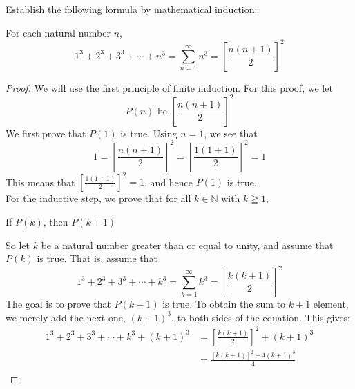 \newpage
\begin{example}
Establish the following formula by mathematical induction:
    
    \begin{tcolorbox}
        \begin{theorem}
            For each natural number $n$,
                \begin{equation*}
                    1^3 + 2^3 + 3^3  + \cdots + n^3 = \sum_{n=1}^{\infty}{n^3} = \left [\frac{n(n+1)}{2} \right ]^2
                \end{equation*}
        \end{theorem}
    \end{tcolorbox}

    \begin{proof}
        We will use the first principle of finite induction. For this proof, we let
            \begin{equation*}
                P(n) \text{ be } \left [\frac{n(n+1)}{2} \right ]^2
            \end{equation*}
        We first prove that $P(1)$ is true. Using $n=1$, we see that
            \begin{equation*}
                1 = \left [\frac{n(n+1)}{2} \right ]^2 = \left [\frac{1(1+1)}{2} \right ]^2 = 1
            \end{equation*}
        This means that $\left [\frac{1(1+1)}{2} \right ]^2 = 1$, and hence $P(1)$ is true. \\
        For the inductive step, we prove that for all $k \in \mathbb{N}$ with $k \geqq 1$, 
            \begin{center}
                If $P(k)$, then $P(k+1)$
            \end{center}
        So let $k$ be a natural number greater than or equal to unity, and assume that $P(k)$ is true. That is, assume that 
            \begin{equation*}
               1^3 + 2^3 + 3^3  + \cdots + k^3 = \sum_{k=1}^{\infty}{k^3} = \left [\frac{k(k+1)}{2} \right ]^2
            \end{equation*}
        The goal is to prove that $P(k+1)$ is true. To obtain the sum to $k+1$ element, we merely add the next one, $(k+1)^3$, to both sides of the equation. This gives: 
            \begin{align*}
                1^3 + 2^3 + 3^3  + \cdots + k^3 + (k+1)^3 & = \left [\frac{k(k+1)}{2} \right ]^2 + (k + 1)^3 \\
                    & = \frac{[k(k+1)]^2 + 4(k+1)^3}{4} \\

\end{align*}
\end{proof}
\end{example}
